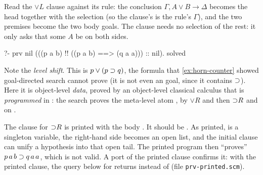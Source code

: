 Read the $\vee L$ clause against its rule: the conclusion $\Gamma,A\vee B\longrightarrow\Delta$ becomes the
head  together with the selection  (so the
clause's  is the rule's $\Gamma$), and the two premises become the two body goals. The
 clause needs no selection of the rest: it only asks that some $A$ be on both sides.
\begin{lprolog}
[logic] ?- prv nil (((p a b) !! ((p a b) ==> (q a a))) :: nil).
solved
\end{lprolog}
Note the \emph{level shift}. This is $p\vee(p\supset q)$, the formula that \cref{ex:horn-counter} showed
goal-directed search cannot prove (it is not even an \fohc{} goal, since it contains $\supset$). Here it is
object-level \emph{data}, proved by an object-level classical calculus that is \emph{programmed} in
\fohc: the search proves the meta-level atom , by $\vee R$ and then ${\supset}R$ and
 on .

\begin{pitfall}
The clause for ${\supset}R$ is printed  with the body . It should be
. As printed,  is a singleton variable, the right-hand side
becomes an open list, and the initial clause can unify a hypothesis into that open tail. The printed
program then ``proves'' $p\,a\,b\supset q\,a\,a$, which is not valid. A \micro{} port of the printed clause
confirms it: with the printed clause, the query below for  returns 
instead of \scm{()} (file \texttt{prv-printed.scm}).
\end{pitfall}

